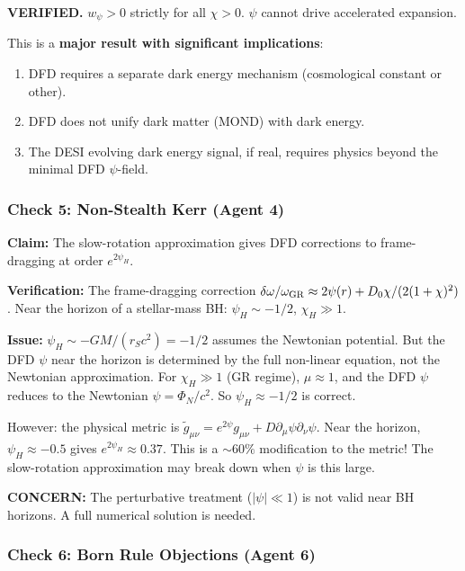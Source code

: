 \documentclass[11pt,a4paper]{article}
\begin{document}
\textcolor{dfdgreen}{\textbf{VERIFIED.}} $w_\psi > 0$ strictly for all $\chi > 0$. $\psi$ cannot drive accelerated expansion.

This is a \textbf{major result with significant implications}:
\begin{enumerate}
\item DFD requires a separate dark energy mechanism (cosmological constant or other).
\item DFD does not unify dark matter (MOND) with dark energy.
\item The DESI evolving dark energy signal, if real, requires physics beyond the minimal DFD $\psi$-field.
\end{enumerate}

\subsubsection{Check 5: Non-Stealth Kerr (Agent 4)}

\textbf{Claim:} The slow-rotation approximation gives DFD corrections to frame-dragging at order $e^{2\psi_H}$.

\textbf{Verification:} The frame-dragging correction $\delta\omega/\omega_{\rm GR} \approx 2\psi(r) + D_0\chi/(2(1+\chi)^2)$. Near the horizon of a stellar-mass BH: $\psi_H \sim -1/2$, $\chi_H \gg 1$.

\textbf{Issue:} $\psi_H \sim -GM/(r_S c^2) = -1/2$ assumes the Newtonian potential. But the DFD $\psi$ near the horizon is determined by the full non-linear equation, not the Newtonian approximation. For $\chi_H \gg 1$ (GR regime), $\mu \approx 1$, and the DFD $\psi$ reduces to the Newtonian $\psi = \Phi_N/c^2$. So $\psi_H \approx -1/2$ is correct.

However: the physical metric is $\tilde{g}_{\mu\nu} = e^{2\psi}g_{\mu\nu} + D\partial_\mu\psi\partial_\nu\psi$. Near the horizon, $\psi_H \approx -0.5$ gives $e^{2\psi_H} \approx 0.37$. This is a $\sim 60\%$ modification to the metric! The slow-rotation approximation may break down when $\psi$ is this large.

\textcolor{dfdyellow}{\textbf{CONCERN:}} The perturbative treatment ($|\psi| \ll 1$) is not valid near BH horizons. A full numerical solution is needed.

\subsubsection{Check 6: Born Rule Objections (Agent 6)}
\end{document}
